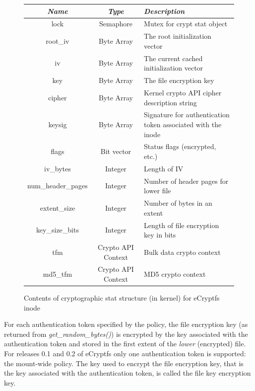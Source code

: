 \documentclass{article}
\begin{document}
\begin{figure}[t]
  \begin{center}
    \begin{tabular}{|c|c|p{2in}|}
      \hline
      \emph{Name} & \emph{Type} & \emph{Description} \\
      \hline
      lock & Semaphore & Mutex for crypt stat object \\
      \hline
      root\_iv & Byte Array & The root initialization vector \\
      \hline
      iv & Byte Array & The current cached initialization vector \\
      \hline
      key & Byte Array & The file encryption key \\
      \hline
      cipher & Byte Array & Kernel crypto API cipher description
      string \\
      \hline
      keysig & Byte Array & Signature for authentication
      token associated with the inode \\
      \hline
      flags & Bit vector & Status flags (encrypted, etc.) \\
      \hline
      iv\_bytes & Integer & Length of IV \\
      \hline
      num\_header\_pages & Integer & Number of header pages for
      lower file \\
      \hline
      extent\_size & Integer & Number of bytes in an extent \\
      \hline
      key\_size\_bits & Integer & Length of file encryption key in
      bits \\
      \hline
      tfm & Crypto API Context & Bulk data crypto context \\
      \hline
      md5\_tfm & Crypto API Context & MD5 crypto context \\
      \hline
    \end{tabular}
    \caption{Contents of cryptographic stat structure (in kernel) for
    eCryptfs inode}
    \label{comp_fig}
  \end{center}
\end{figure}

For each authentication token specified by the policy, the file encryption
key (as returned from \emph{get\_random\_bytes()}) is encrypted by the key
associated with the authentication token and stored in the first extent of
the \emph{lower} (encrypted) file. For releases 0.1 and 0.2 of eCryptfs
only one authentication token is supported: the mount-wide policy.
The key used to encrypt the file encryption key, that is the key
associated with the authentication token, is called the file key encryption
key.
\end{document}
